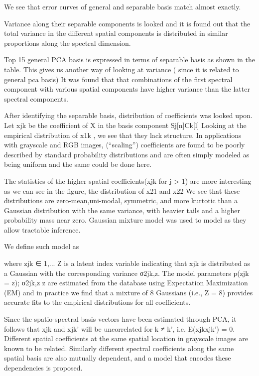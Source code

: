 \documentclass{article}
\begin{document}
We see that error curves of general and separable basis match almost exactly.

Variance along their separable components is looked and it is found out that the total variance in the different spatial components is distributed in similar proportions along the spectral dimension.

Top 15 general PCA basis is expressed in terms of separable basis as shown in the table.
This gives us another way of looking at variance ( since it is related to general pca basis)
It was found that that combinations of the first spectral component with various spatial components have higher variance than the latter spectral components. 

After identifying the separable basis, distribution of coefficients  was looked upon. 
Let xjk be the coefficient of X in the basis component Sj[n]Ck[l]
Looking at the empirical distribution of x1k , we see that they lack structure.
In applications with grayscale and RGB images, (“scaling”) coefficients are found to be poorly described by standard probability distributions and are often simply modeled as being uniform and the same could be done here.     

The statistics of the higher spatial coefficients(xjk for j > 1) are more interesting as we can see in the figure, the distribution of  x21  and x22 
 We see that these distributions are zero-mean,uni-modal, symmetric, and more kurtotic than a Gaussian distribution with the same variance, with heavier tails and a higher probability mass near zero.
Gaussian mixture model was used to model as they allow tractable inference. 

We define such model as

where zjk ∈ {1,... Z} is a latent index variable indicating that xjk is distributed as a Gaussian with the corresponding variance σ2jk,z.
The model parameters {p(zjk = z);  σ2jk,z  }z are estimated from the database using Expectation Maximization (EM)  and in practice we find that a mixture of 8 Gaussians (i.e., Z = 8) provides accurate fits to the empirical distributions for all coefficients.

Since the spatio-spectral basis vectors have been estimated through PCA, it follows that xjk and xjk’ will be uncorrelated for k ≠ k’, i.e. E(xjkxjk’) = 0.
Different spatial coefficients at the same spatial location in grayscale images are known to be related. Similarly different spectral coefficients along the same spatial basis are also mutually dependent, and a model that encodes these dependencies is proposed.
\end{document}
